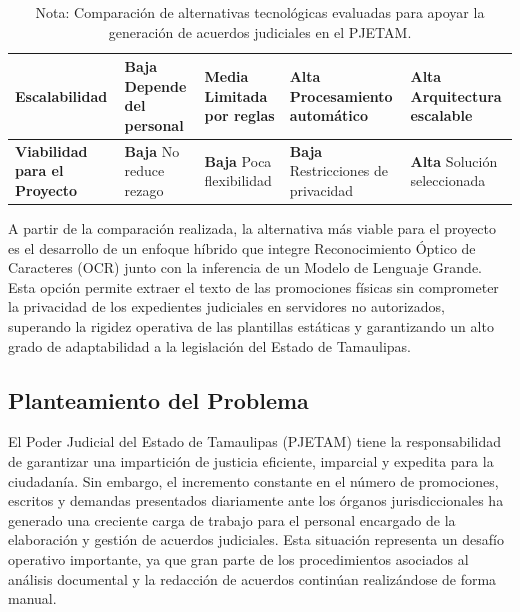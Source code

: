 \begin{table}[H]
\begin{tabular}{|p{2.8cm}|p{2.7cm}|p{2.7cm}|p{2.7cm}|p{3.0cm}|}
        \textbf{Escalabilidad} &
        \textbf{Baja} \newline Depende del personal &
        \textbf{Media} \newline Limitada por reglas &
        \textbf{Alta} \newline Procesamiento automático &
        \textbf{Alta} \newline Arquitectura escalable \\
        \hline
        
        \textbf{Viabilidad para el Proyecto} &
        \textbf{Baja} \newline No reduce rezago &
        \textbf{Baja} \newline Poca flexibilidad &
        \textbf{Baja} \newline Restricciones de privacidad &
        \textbf{Alta} \newline Solución seleccionada \\
        \hline
        
    \end{tabular}
    \caption*{\footnotesize Nota: Comparación de alternativas tecnológicas evaluadas para apoyar la generación de acuerdos judiciales en el PJETAM.}
\end{table}

A partir de la comparación realizada, la alternativa más viable para el proyecto es el desarrollo de un enfoque híbrido que integre Reconocimiento Óptico de Caracteres (OCR) junto con la inferencia de un Modelo de Lenguaje Grande. Esta opción permite extraer el texto de las promociones físicas sin comprometer la privacidad de los expedientes judiciales en servidores no autorizados, superando la rigidez operativa de las plantillas estáticas y garantizando un alto grado de adaptabilidad a la legislación del Estado de Tamaulipas.

\subsection{Planteamiento del Problema}
\label{sec:problema}

El Poder Judicial del Estado de Tamaulipas (PJETAM) tiene la responsabilidad de garantizar una impartición de justicia eficiente, imparcial y expedita para la ciudadanía. Sin embargo, el incremento constante en el número de promociones, escritos y demandas presentados diariamente ante los órganos jurisdiccionales ha generado una creciente carga de trabajo para el personal encargado de la elaboración y gestión de acuerdos judiciales. Esta situación representa un desafío operativo importante, ya que gran parte de los procedimientos asociados al análisis documental y la redacción de acuerdos continúan realizándose de forma manual.

